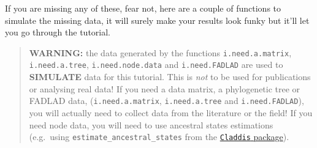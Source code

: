 \documentclass[
]{book}
\begin{document}
If you are missing any of these, fear not, here are a couple of functions to simulate the missing data, it will surely make your results look funky but it'll let you go through the tutorial.

\begin{quote}
\textbf{WARNING:} the data generated by the functions \texttt{i.need.a.matrix}, \texttt{i.need.a.tree}, \texttt{i.need.node.data} and \texttt{i.need.FADLAD} are used to \textbf{SIMULATE} data for this tutorial. This is \emph{not} to be used for publications or analysing real data!
If you need a data matrix, a phylogenetic tree or FADLAD data, (\texttt{i.need.a.matrix}, \texttt{i.need.a.tree} and \texttt{i.need.FADLAD}), you will actually need to collect data from the literature or the field! If you need node data, you will need to use ancestral states estimations (e.g.~using \texttt{estimate\_ancestral\_states} from the \href{https://cran.r-project.org/web/packages/Claddis/index.html}{\texttt{Claddis} package}).
\end{quote}
\end{document}
